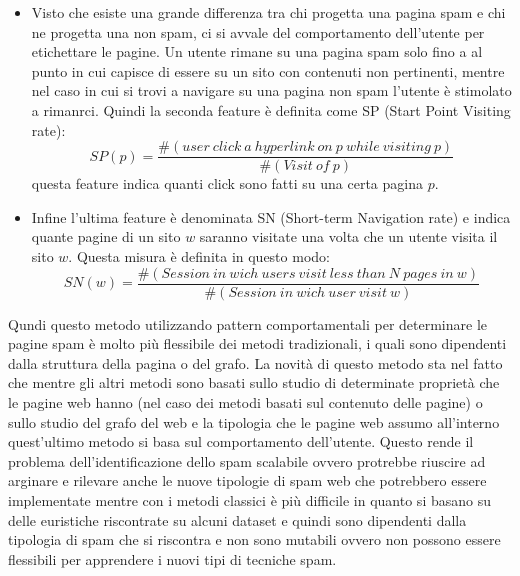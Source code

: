 \begin{itemize}
 \item Visto che esiste una grande differenza tra chi progetta una pagina spam e chi ne progetta una non spam, ci si avvale del comportamento dell'utente per etichettare le pagine. Un utente rimane su una pagina spam solo fino a al punto in cui capisce di essere su un sito con contenuti non pertinenti, mentre nel caso in cui si trovi a navigare su una pagina non spam l'utente è stimolato a rimanrci. Quindi la seconda feature è definita come SP (Start Point Visiting rate):
 \begin{equation}
  SP(p)=\frac{\#(user\ click\ a\ hyperlink\ on\ p\ while\ visiting\ p)}{\#(Visit\ of\ p)}
 \end{equation}
 questa feature indica quanti click sono fatti su una certa pagina \(p\).
 \item Infine l'ultima feature è denominata SN (Short-term Navigation rate) e indica quante pagine di un sito \(w\) saranno visitate una volta che un utente visita il sito \(w\). Questa misura è definita in questo modo:
 \begin{equation}
  SN(w)=\frac{\#(Session\ in\ wich\ users\ visit\ less\ than\ N\ pages\ in\ w)}{\#(Session\ in\ wich\ user\ visit\ w)}
 \end{equation}
 \end{itemize}
Qundi questo metodo utilizzando pattern comportamentali per determinare le pagine spam è molto più flessibile dei metodi tradizionali, i quali sono dipendenti dalla struttura della pagina o del grafo. La novità di questo metodo sta nel fatto che mentre gli altri metodi sono basati sullo studio di determinate proprietà che le pagine web hanno (nel caso dei metodi basati sul contenuto delle pagine) o sullo studio del grafo del web e la tipologia che le pagine web assumo all'interno quest'ultimo metodo si basa sul comportamento dell'utente. Questo rende il problema dell'identificazione dello spam scalabile ovvero protrebbe riuscire ad arginare e rilevare anche le nuove tipologie di spam web che potrebbero essere implementate mentre con i metodi classici è più difficile in quanto si basano su delle euristiche riscontrate su alcuni dataset e quindi sono dipendenti dalla tipologia di spam che si riscontra e non sono mutabili ovvero non possono essere flessibili per apprendere i nuovi tipi di tecniche spam.

